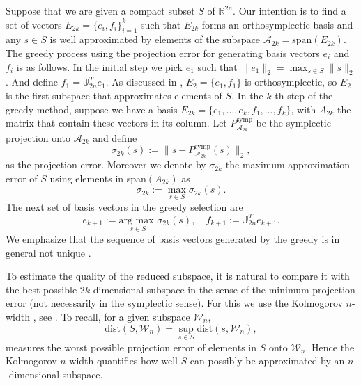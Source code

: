 Suppose that we are given a compact subset $S$ of $\mathbb R^{2n}$. Our intention is to find a set of vectors $E_{2k}=\{e_i,f_i\}_{i=1}^k$ such that $E_{2k}$ forms an orthosymplectic basis and any $s\in S$ is well approximated by elements of the subspace $\mathcal A_{2k}= \text{span}(E_{2k})$. The greedy process using the projection error for generating basis vectors $e_i$ and $f_i$ is as follows. In the initial step we pick $e_1$ such that $\|e_1\|_2 = \max_{s\in S} \|s\|_2$. And define $f_1 = \mathbb{J}_{2n}^T e_1$. As discussed in ,  $E_2 = \{e_1,f_1\}$ is orthosymplectic, so $E_2$ is the first subspace that approximates elements of $S$. In the $k$-th step of the greedy method, suppose we have a basis $E_{2k} = \{ e_1,\dots, e_k , f_1,\dots ,f_k \}$, with $A_{2k}$ the matrix that contain these vectors in its column. Let $P_{\mathcal A_{2k}}^{\text{symp}}$ be the symplectic projection onto $\mathcal A_{2k}$ and define
\begin{equation} \label{eq:new1}
	\sigma_{2k}(s) := \|s-P_{\mathcal A_{2k}}^{\text{symp}}(s)\|_2,
\end{equation}
as the projection error. Moreover we denote by $\sigma_{2k}$ the maximum approximation error of $S$ using elements in span$(A_{2k})$ as
\begin{equation} \label{eq:new2}
	\sigma_{2k} := \max_{s\in S} \sigma_{2k}(s).
\end{equation}
The next set of basis vectors in the greedy selection are
\begin{equation} \label{eq:new3}
	e_{k+1} := \underset{s\in S}{\text{arg\ max }}\sigma_{2k}(s), \quad f_{k+1} := \mathbb{J}_{2n}^T e_{k+1}.
\end{equation}
We emphasize that the sequence of basis vectors generated by the greedy is in general not unique \cite{quarteroni2015reduced,hesthaven2015certified}. 

To estimate the quality of the reduced subspace, it is natural to compare it with the best possible $2k$-dimensional subspace in the sense of the minimum projection error (not necessarily in the symplectic sense). For this we use the Kolmogorov $n$-width \cite{Kolmogoroff:1936fj,pinkus1985n}, see . To recall, for a given subspace $\mathcal W_n$,
\begin{equation}
	\text{dist}(S,\mathcal W_n) = \sup_{s\in S} \text{dist}(s,\mathcal W_n),
\end{equation}
measures the worst possible projection error of elements in $S$ onto $\mathcal W_n$. Hence the Kolmogorov $n$-width quantifies how well $S$ can possibly be approximated by an $n$-dimensional subspace. 

